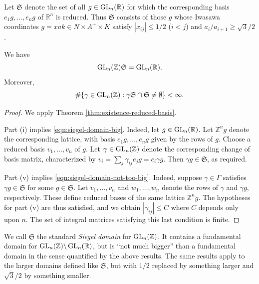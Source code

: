 \documentclass[reqno]{amsart} 
\begin{document}
\begin{definition}\label{defn:standard-siegel-domain}
  Let $\mathfrak{S}$ denote the set of all $g \in \operatorname{GL}_n(\mathbb{R})$ for which the corresponding basis $e_1 g, \dotsc, e_n g$ of $\mathbb{R}^n$ is reduced.  Thus $\mathfrak{S}$ consists of those $g$ whose Iwasawa coordinates $g = x a k \in N \times A^+ \times K$ satisfy $|x_{i j}| \leq 1/2$ ($i < j$) and $a_i / a_{i+1} \geq \sqrt{3}/2$.
\end{definition}

\begin{theorem}\label{thm:siegel-domain-basics}
  We have
  \begin{equation}\label{eqn:siegel-domain-big}
    \operatorname{GL}_n(\mathbb{Z}) \mathfrak{S}  = \operatorname{GL}_n(\mathbb{R}).
  \end{equation}
  Moreover,
  \begin{equation}\label{eqn:siegel-domain-not-too-big}
    \# \{\gamma \in \operatorname{GL}_n(\mathbb{Z}) :
    \gamma \mathfrak{S} \cap \mathfrak{S} \neq \emptyset \}
    < \infty.
  \end{equation}
\end{theorem}
\begin{proof}
  We apply Theorem \ref{thm:existence-reduced-basis}.

  Part (i) implies \eqref{eqn:siegel-domain-big}.  Indeed, let $g \in \operatorname{GL}_n(\mathbb{R})$.  Let $\mathbb{Z}^n g$ denote the corresponding lattice, with basis $e_1 g, \dotsc, e_n g$ given by the rows of $g$.  Choose a reduced basis $v_1,\dotsc,v_n$ of $g$.  Let $\gamma \in \operatorname{GL}_n(\mathbb{Z})$ denote the corresponding change of basis matrix, characterized by $v_i = \sum_j \gamma_{i j} e_j g = e_i \gamma g$.  Then $\gamma g \in \mathfrak{S}$, as required.
  
  Part (v) implies \eqref{eqn:siegel-domain-not-too-big}.  Indeed, suppose $\gamma \in \Gamma$ satisfies $\gamma g \in \mathfrak{S}$ for some $g \in \mathfrak{S}$.  Let $v_1,\dotsc,v_n$ and $w_1,\dotsc,w_n$ denote the rows of $\gamma$ and $\gamma g$, respectively.  These define reduced bases of the same lattice $\mathbb{Z}^n g$.  The hypotheses for part (v) are thus satisfied, and we obtain $|\gamma_{i j}| \leq C$ where $C$ depends only upon $n$.  The set of integral matrices satisfying this last condition is finite.
\end{proof}

We call $\mathfrak{S}$ the standard \emph{Siegel domain} for $\operatorname{GL}_n(\mathbb{Z})$.  It contains a fundamental domain for $\operatorname{GL}_n(\mathbb{Z}) \backslash \operatorname{GL}_n(\mathbb{R})$, but is ``not much bigger'' than a fundamental domain in the sense quantified by the above results.  The same results apply to the larger domains defined like $\mathfrak{S}$, but with $1/2$ replaced by something larger and $\sqrt{3}/2$ by something smaller.
\end{document}
